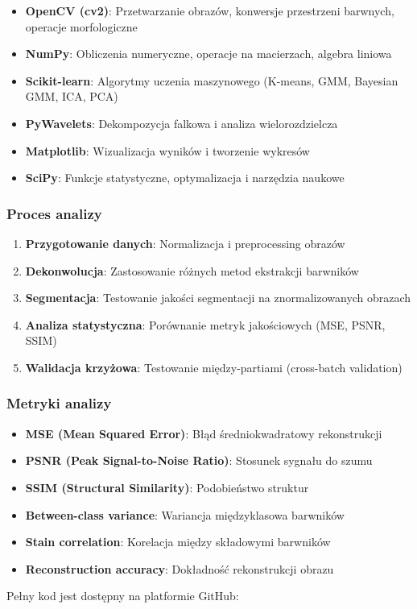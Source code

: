 \documentclass{article}
\begin{document}
\begin{itemize}
    \item \textbf{OpenCV (cv2)}: Przetwarzanie obrazów, konwersje przestrzeni barwnych, operacje morfologiczne
    \item \textbf{NumPy}: Obliczenia numeryczne, operacje na macierzach, algebra liniowa
    \item \textbf{Scikit-learn}: Algorytmy uczenia maszynowego (K-means, GMM, Bayesian GMM, ICA, PCA)
    \item \textbf{PyWavelets}: Dekompozycja falkowa i analiza wielorozdzielcza
    \item \textbf{Matplotlib}: Wizualizacja wyników i tworzenie wykresów
    \item \textbf{SciPy}: Funkcje statystyczne, optymalizacja i narzędzia naukowe
\end{itemize}
\subsubsection{Proces analizy}
\begin{enumerate}
    \item \textbf{Przygotowanie danych}: Normalizacja i preprocessing obrazów
    \item \textbf{Dekonwolucja}: Zastosowanie różnych metod ekstrakcji barwników
    \item \textbf{Segmentacja}: Testowanie jakości segmentacji na znormalizowanych obrazach
    \item \textbf{Analiza statystyczna}: Porównanie metryk jakościowych (MSE, PSNR, SSIM)
    \item \textbf{Walidacja krzyżowa}: Testowanie między-partiami (cross-batch validation)
\end{enumerate}

\subsubsection{Metryki analizy}
\begin{itemize}
    \item \textbf{MSE (Mean Squared Error)}: Błąd średniokwadratowy rekonstrukcji
    \item \textbf{PSNR (Peak Signal-to-Noise Ratio)}: Stosunek sygnału do szumu
    \item \textbf{SSIM (Structural Similarity)}: Podobieństwo struktur
    \item \textbf{Between-class variance}: Wariancja międzyklasowa barwników
    \item \textbf{Stain correlation}: Korelacja między składowymi barwników
    \item \textbf{Reconstruction accuracy}: Dokładność rekonstrukcji obrazu
\end{itemize}
Pełny kod jest dostępny na platformie GitHub:
\end{document}
